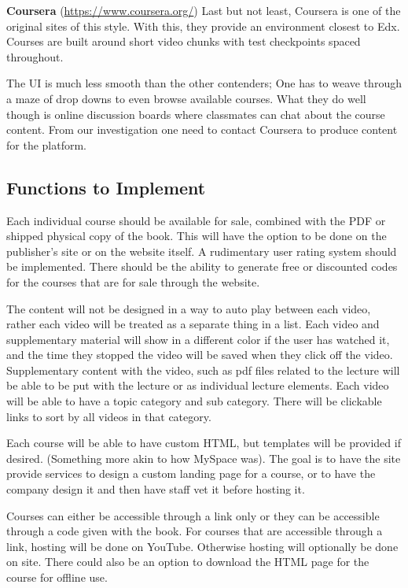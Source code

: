 \documentclass{article}
\begin{document}
\textbf{Coursera} (\url{https://www.coursera.org/})
Last but not least, Coursera is one of the original sites of this style. With
this, they provide an environment closest to Edx. Courses are built around short
video chunks with test checkpoints spaced throughout.

The UI is much less smooth than the other contenders; One has to weave through
a maze of drop downs to even browse available courses. What they do well though
is online discussion boards where classmates can chat about the course content.
From our investigation one need to contact Coursera to produce content for the
platform. \vspace{\baselineskip}

\subsection{Functions to Implement}

Each individual course should be available for sale, combined with the PDF or shipped physical copy of the book. This will have the option to be done on the publisher's site or on the website itself. A rudimentary user rating system should be implemented. There should be the ability to generate free or discounted codes for the courses that are for sale through the website.

The content will not be designed in a way to auto play between each video, rather each video will be treated as a separate thing in a list. Each video and supplementary material will show in a different color if the user has watched it, and the time they stopped the video will be saved when they click off the video. Supplementary content with the video, such as pdf files related to the lecture will be able to be put with the lecture or as individual lecture elements. Each video will be able to have a topic category and sub category. There will be clickable links to sort by all videos in that category.

Each course will be able to have custom HTML, but templates will be provided if desired. (Something more akin to how MySpace was). The goal is to have the site provide services to design a custom landing page for a course, or to have the company design it and then have staff vet it before hosting it.

Courses can either be accessible through a link only or they can be accessible through a code given with the book. For courses that are accessible through a link, hosting will be done on YouTube. Otherwise hosting will optionally be done on site. There could also be an option to download the HTML page for the course for offline use.
\end{document}
